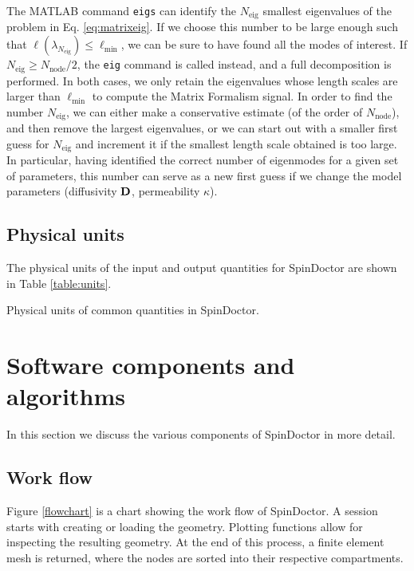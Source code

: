 \documentclass[a4paper]{article}
\begin{document}
The MATLAB command \verb+eigs+ can identify the $N_\text{eig}$ smallest eigenvalues of the problem in Eq. \eqref{eq:matrixeig}. If we choose this number to be large enough such that $\ell(\lambda_{N_\text{eig}}) \leq \ell_\text{min}$, we can be sure to have found all the modes of interest. If $N_\text{eig} \geq N_\text{node} / 2$, the \verb+eig+ command is called instead, and a full decomposition is performed. In both cases, we only retain the eigenvalues whose length scales are larger than $\ell_\text{min}$ to compute the Matrix Formalism signal. In order to find the number $N_\text{eig}$, we can either make a conservative estimate (of the order of $N_\text{node}$), and then remove the largest eigenvalues, or we can start out with a smaller first guess for $N_\text{eig}$ and increment it if the smallest length scale obtained is too large. In particular, having identified the correct number of eigenmodes for a given set of parameters, this number can serve as a new first guess if we change the model parameters (diffusivity $\mathbf{D}$, permeability $\kappa$).




\subsection{Physical units}

The physical units of the input and output quantities for SpinDoctor are shown in Table \ref{table:units}.

\begin{table}
    \centering
    
    \caption{Physical units of common quantities in SpinDoctor.}
    \label{table:units}
\end{table}




\section{Software components and algorithms}

In this section we discuss the various components of SpinDoctor in more detail.



\subsection{Work flow}


Figure \ref{flowchart} is a chart showing the work flow of SpinDoctor. A session starts with creating or loading the geometry. Plotting functions allow for inspecting the resulting geometry. At the end of this process, a finite element mesh is returned, where the nodes are sorted into their respective compartments.
\end{document}
